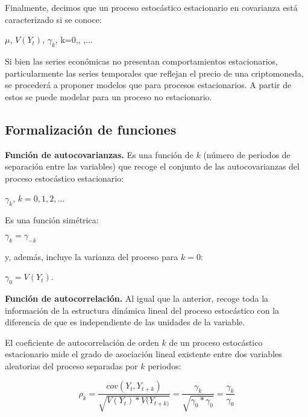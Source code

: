 \documentclass[a4paper,10pt]{article}
\begin{document}
Finalmente, decimos que un proceso estocástico estacionario en covarianza está caracterizado si se conoce:

\begin{center}
 $\mu$, $V(Y_t)$, $\gamma_k$, k=0,, ,...
\end{center}

Si bien las series económicas no presentan comportamientos estacionarios, particularmente las series temporales que reflejan el precio de una criptomoneda, se procederá a proponer modelos que para procesos estacionarios. A partir de estos se puede modelar para un proceso no estacionario.

\subsection{Formalización de funciones}

\textbf{Función de autocovarianzas.} Es una función de $k$ (número
de periodos de separación entre las variables) que recoge el conjunto de las autocovarianzas del proceso estocástico estacionario:

\begin{center}
$\gamma_k$, $k=0,1,2,...$
\end{center}

Es una función simétrica:

\begin{center}
$\gamma_k = \gamma_{-k}$
\end{center}

y, además, incluye la varianza del proceso para $k=0$:

\begin{center}
$\gamma_0 = V(Y_t)$.
\end{center}

\textbf{Función de autocorrelación.} Al igual que la anterior, recoge toda la información de la estructura dinámica lineal del proceso estocástico con la diferencia de que es independiente de las unidades de la variable.

El coeficiente de autocorrelación de orden $k$ de un proceso estocástico estacionario mide el grado de asociación lineal existente entre dos variables aleatorias del proceso separadas por $k$ periodos:

\begin{equation}
\rho_k = \frac{cov(Y_t, Y_{t+k})}{\sqrt{V(Y_t)*V(Y_{t+k)}}} = \frac{\gamma_k}{\sqrt{\gamma_0 * \gamma_0}} = \frac{\gamma_k}{\gamma_0}
\end{equation}
\end{document}
